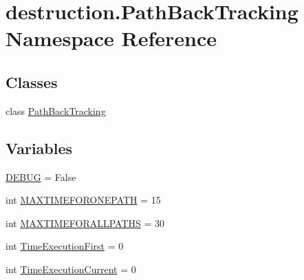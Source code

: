 \hypertarget{namespacedestruction_1_1_path_back_tracking}{\section{destruction.\-Path\-Back\-Tracking Namespace Reference}
\label{namespacedestruction_1_1_path_back_tracking}
}
\subsection*{Classes}
\begin{DoxyCompactItemize}
\item 
class \hyperlink{classdestruction_1_1_path_back_tracking_1_1_path_back_tracking}{Path\-Back\-Tracking}
\end{DoxyCompactItemize}
\subsection*{Variables}
\begin{DoxyCompactItemize}
\item 
\hyperlink{namespacedestruction_1_1_path_back_tracking_a5337d88e7e193b2cc87f7940620d98fc}{D\-E\-B\-U\-G} = False
\item 
int \hyperlink{namespacedestruction_1_1_path_back_tracking_ae461d82751bb7a1185c14d0706860ac9}{M\-A\-X\-T\-I\-M\-E\-F\-O\-R\-O\-N\-E\-P\-A\-T\-H} = 15
\item 
int \hyperlink{namespacedestruction_1_1_path_back_tracking_a9ba81cc3a727132d88a0b1e0e6742a64}{M\-A\-X\-T\-I\-M\-E\-F\-O\-R\-A\-L\-L\-P\-A\-T\-H\-S} = 30
\item 
int \hyperlink{namespacedestruction_1_1_path_back_tracking_afc63996ebc69073f44f91c3aa0c1cee9}{Time\-Execution\-First} = 0
\item 
int \hyperlink{namespacedestruction_1_1_path_back_tracking_aaab96ffe6eb03cedde99cdb61b8ae998}{Time\-Execution\-Current} = 0
\end{DoxyCompactItemize}


